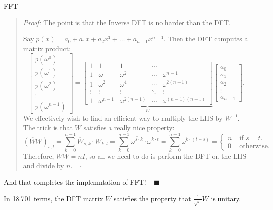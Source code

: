 \begin{solution}{FFT}
\begin{quote}
        \emph{Proof:} The point is that the Inverse DFT is no harder than the DFT.

        Say $p(x) = a_0 + a_1x + a_2x^2 + \dots + a_{n - 1}x^{n - 1}$.  Then the DFT computes a matrix product:
        \[ \begin{bmatrix} p(\omega^0) \\ p(\omega^1) \\ p(\omega^2) \\ \vdots \\ p(\omega^{n - 1}) \end{bmatrix}
        = \underbrace{\begin{bmatrix} 1 & 1 & 1 & \cdots & 1 \\ 1 & \omega & \omega^2 & \cdots & \omega^{n - 1} \\ 1 & \omega^2 & \omega^4 & \cdots & \omega^{2(n - 1)} \\ \vdots & \vdots & \vdots & \ddots & \vdots \\ 1 & \omega^{n - 1} & \omega^{2(n - 1)} & \cdots & \omega^{(n - 1)(n - 1)} \end{bmatrix}}_{W} \begin{bmatrix} a_0 \\ a_1 \\ a_2 \\ \vdots \\ a_{n - 1} \end{bmatrix}. \]
        We effectively wish to find an efficient way to multiply the LHS by $W^{-1}$.  The trick is that $W$ satisfies a really nice property:
        \[ \left(\overline{W} W\right)_{s, t} = \sum_{k = 0}^{n - 1} \overline{W}_{s, k} \cdot W_{k, t} = \sum_{k = 0}^{n - 1} \overline{\omega^{s \cdot k}} \cdot \omega^{k \cdot t} = \sum_{k = 0}^{n - 1} \omega^{k \cdot (t - s)} = \begin{cases} n & \text{ if } s = t. \\
            0 & \text{ otherwise.} \end{cases} \]
        Therefore, $\overline{W}W = nI$, so all we need to do is perform the DFT on the LHS and divide by $n$. ~ $\square$
    \end{quote}
    And that completes the implemntation of FFT! ~ $\blacksquare$
\end{solution}

\begin{remark}
    In 18.701 terms, the DFT matrix $W$ satisfies the property that $\frac{1}{\sqrt{n}}W$ is unitary.
\end{remark}

